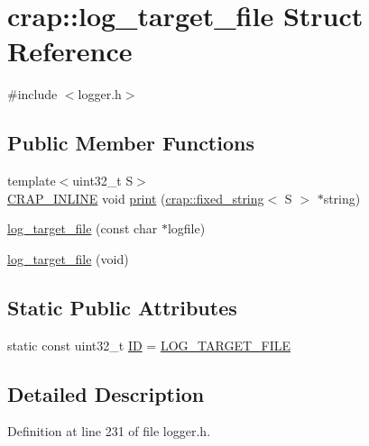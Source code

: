 \hypertarget{structcrap_1_1log__target__file}{\section{crap\+:\+:log\+\_\+target\+\_\+file Struct Reference}
\label{structcrap_1_1log__target__file}
}


{\ttfamily \#include $<$logger.\+h$>$}

\subsection*{Public Member Functions}
\begin{DoxyCompactItemize}
\item 
{\footnotesize template$<$uint32\+\_\+t S$>$ }\\\hyperlink{config__x86_8h_a5a40526b8d842e7ff731509998bb0f1c}{C\+R\+A\+P\+\_\+\+I\+N\+L\+I\+N\+E} void \hyperlink{structcrap_1_1log__target__file_ab553b7699a39201299d55fcc33ce7f39}{print} (\hyperlink{classcrap_1_1fixed__string}{crap\+::fixed\+\_\+string}$<$ S $>$ $\ast$string)
\item 
\hyperlink{structcrap_1_1log__target__file_aa70a9e95eeecffe90641c999a9fd83dd}{log\+\_\+target\+\_\+file} (const char $\ast$logfile)
\item 
\hyperlink{structcrap_1_1log__target__file_a4637777bf413912f1ec724a8beb4b11d}{log\+\_\+target\+\_\+file} (void)
\end{DoxyCompactItemize}
\subsection*{Static Public Attributes}
\begin{DoxyCompactItemize}
\item 
static const uint32\+\_\+t \hyperlink{structcrap_1_1log__target__file_acf3fecd666f8318bbd09d33ca0531803}{I\+D} = \hyperlink{logger_8h_a15b53599af6891ab8add65cc94e2acb7}{L\+O\+G\+\_\+\+T\+A\+R\+G\+E\+T\+\_\+\+F\+I\+L\+E}
\end{DoxyCompactItemize}


\subsection{Detailed Description}


Definition at line 231 of file logger.\+h.



